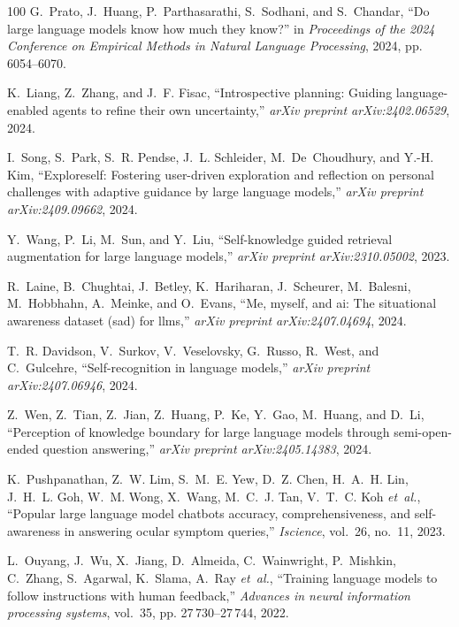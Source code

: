 \documentclass[10pt,journal,compsoc]{IEEEtran}
\begin{document}
\begin{thebibliography}{100}
	G.~Prato, J.~Huang, P.~Parthasarathi, S.~Sodhani, and S.~Chandar, ``Do large
	language models know how much they know?'' in \emph{Proceedings of the 2024
		Conference on Empirical Methods in Natural Language Processing}, 2024, pp.
	6054--6070.
	
	K.~Liang, Z.~Zhang, and J.~F. Fisac, ``Introspective planning: Guiding
	language-enabled agents to refine their own uncertainty,'' \emph{arXiv
		preprint arXiv:2402.06529}, 2024.
	
	I.~Song, S.~Park, S.~R. Pendse, J.~L. Schleider, M.~De~Choudhury, and Y.-H.
	Kim, ``Exploreself: Fostering user-driven exploration and reflection on
	personal challenges with adaptive guidance by large language models,''
	\emph{arXiv preprint arXiv:2409.09662}, 2024.
	
	Y.~Wang, P.~Li, M.~Sun, and Y.~Liu, ``Self-knowledge guided retrieval
	augmentation for large language models,'' \emph{arXiv preprint
		arXiv:2310.05002}, 2023.
	
	R.~Laine, B.~Chughtai, J.~Betley, K.~Hariharan, J.~Scheurer, M.~Balesni,
	M.~Hobbhahn, A.~Meinke, and O.~Evans, ``Me, myself, and ai: The situational
	awareness dataset (sad) for llms,'' \emph{arXiv preprint arXiv:2407.04694},
	2024.
	
	T.~R. Davidson, V.~Surkov, V.~Veselovsky, G.~Russo, R.~West, and C.~Gulcehre,
	``Self-recognition in language models,'' \emph{arXiv preprint
		arXiv:2407.06946}, 2024.
	
	Z.~Wen, Z.~Tian, Z.~Jian, Z.~Huang, P.~Ke, Y.~Gao, M.~Huang, and D.~Li,
	``Perception of knowledge boundary for large language models through
	semi-open-ended question answering,'' \emph{arXiv preprint arXiv:2405.14383},
	2024.
	
	K.~Pushpanathan, Z.~W. Lim, S.~M.~E. Yew, D.~Z. Chen, H.~A.~H. Lin, J.~H.~L.
	Goh, W.~M. Wong, X.~Wang, M.~C.~J. Tan, V.~T.~C. Koh \emph{et~al.}, ``Popular
	large language model chatbots accuracy, comprehensiveness, and self-awareness
	in answering ocular symptom queries,'' \emph{Iscience}, vol.~26, no.~11,
	2023.
	
	L.~Ouyang, J.~Wu, X.~Jiang, D.~Almeida, C.~Wainwright, P.~Mishkin, C.~Zhang,
	S.~Agarwal, K.~Slama, A.~Ray \emph{et~al.}, ``Training language models to
	follow instructions with human feedback,'' \emph{Advances in neural
		information processing systems}, vol.~35, pp. 27\,730--27\,744, 2022.
	

\end{thebibliography}
\end{document}
